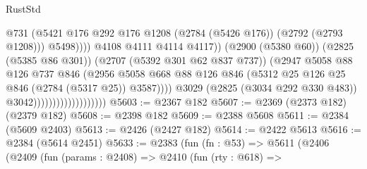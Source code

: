 \begin{lexlean}{RustStd}
\begin{coremodule}
                                                        @731
                                                        (@5421
                                                          @176
                                                          @292
                                                          @176
                                                          @1208
                                                          (@2784 (@5426 @176))
                                                          (@2792 (@2793 @1208)))
                                                        @5498))))
                                                @4108
                                                @4111
                                                @4114
                                                @4117))
                                            (@2900 (@5380 @60))
                                            (@2825 (@5385 @86 @301))
                                            (@2707 (@5392 @301 @62 @837 @737))
                                            (@2947
                                              @5058
                                              @88
                                              @126
                                              @737
                                              @846
                                              (@2956
                                                @5058
                                                @668
                                                @88
                                                @126
                                                @846
                                                (@5312
                                                  @25
                                                  @126
                                                  @25
                                                  @846
                                                  (@2784 (@5317 @25))
                                                  @3587))))
                                          @3029
                                          (@2825 (@3034 @292 @330 @483))
                                          @3042)))))))))))))))))))
@5603 := @2367 @182
@5607 := @2369 (@2373 @182) (@2379 @182)
@5608 := @2398 @182
@5609 := @2388 @5608
@5611 := @2384 (@5609 @2403)
@5613 := @2426 (@2427 @182)
@5614 := @2422 @5613
@5616 := @2384 (@5614 @2451)
@5633 := @2383
    (fun (fn : @53) =>
    @5611
      (@2406
        (@2409
          (fun (params : @2408) =>
          @2410
            (fun (rty : @618) =>

\end{coremodule}
\end{lexlean}

